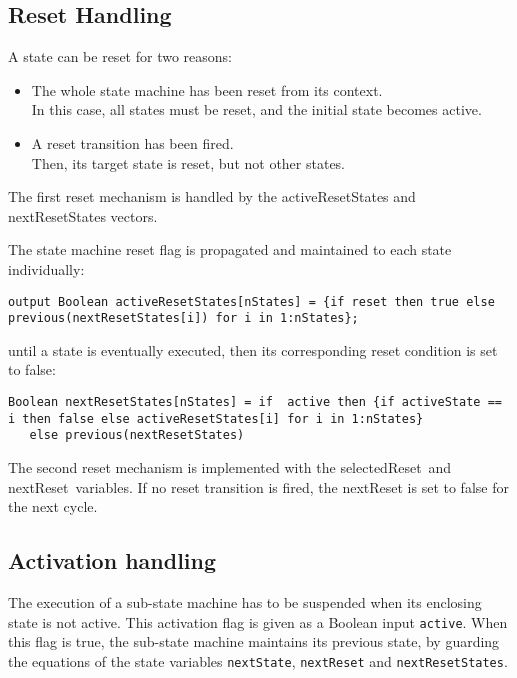 \subsection{Reset Handling}

A state can be reset for two reasons:

\begin{itemize}
\item
  The whole state machine has been reset from its context.\\
  In this case, all states must be reset, and the initial state becomes
  active.
\item
  A reset transition has been fired.\\
  Then, its target state is reset, but not other states.
\end{itemize}

The first reset mechanism is handled by the activeResetStates and
nextResetStates vectors.

The state machine reset flag is propagated and maintained to each state
individually:

\begin{lstlisting}[language=modelica]
  output Boolean activeResetStates[nStates] = {if reset then true else previous(nextResetStates[i]) for i in 1:nStates};
\end{lstlisting}
until a state is eventually executed, then its corresponding reset
condition is set to false:

\begin{lstlisting}[language=modelica]
  Boolean nextResetStates[nStates] = if  active then {if activeState == i then false else activeResetStates[i] for i in 1:nStates}
   else previous(nextResetStates)
\end{lstlisting}
The second reset mechanism is implemented with the selectedReset~and
nextReset~variables. If no reset transition is fired, the nextReset is
set to false for the next cycle.

\subsection{Activation handling}

The execution of a sub-state machine has to be suspended when its
enclosing state is not active. This activation flag is given as a
Boolean input \lstinline!active!. When this flag is true, the sub-state machine
maintains its previous state, by guarding the equations of the state
variables \lstinline!nextState!, \lstinline!nextReset! and \lstinline!nextResetStates!.

